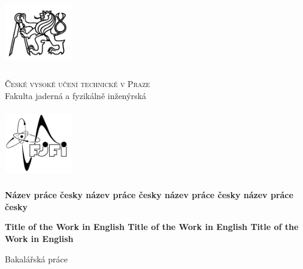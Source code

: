 \documentclass[a4paper,11pt]{book}
\begin{document}
\def\documentdate{7. července 2017}

\pagestyle{empty}
{\centering

\noindent %
\begin{minipage}[c]{3cm}%
\noindent \begin{center}
\includegraphics[width=3cm,height=3cm,keepaspectratio]{images/titlepage/cvut}
\par\end{center}%
\end{minipage}%
\begin{minipage}[c]{0.6\linewidth}%
\begin{center}
\textsc{\large{}České vysoké učení technické v Praze}{\large{}}\\
{\large{}Fakulta jaderná a fyzikálně inženýrská}
\par\end{center}%
\end{minipage}%
\begin{minipage}[c]{3cm}%
\noindent \begin{center}
\includegraphics[width=3cm,height=3cm,keepaspectratio]{images/titlepage/fjfi}
\par\end{center}%
\end{minipage}

\vspace{3cm}


\textbf{\huge{}Název práce česky název práce česky název práce česky
název práce česky}{\huge \par}

\vspace{1cm}


%
\textbf{\huge{}Title of the Work in English Title of the Work in English
Title of the Work in English}{\huge \par}

%
\vspace{2cm}


{\large{}Bakalářská práce}{\large \par}

}
\end{document}
